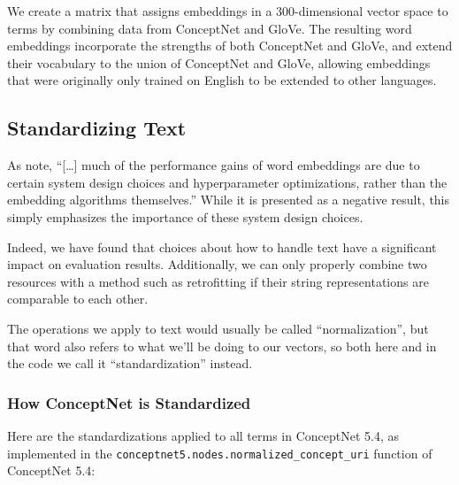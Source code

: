 \documentclass[letterpaper]{article}
\begin{document}
We create a matrix that assigns embeddings in a 300-dimensional vector
space to terms by combining data from ConceptNet and GloVe. The resulting word
embeddings incorporate the strengths of both ConceptNet and GloVe, and extend
their vocabulary to the union of ConceptNet and GloVe, allowing embeddings that
were originally only trained on English to be extended to other languages.

\subsection{Standardizing Text}

As  note,
``[\ldots] much of the performance gains of word embeddings are due to certain
system design choices and hyperparameter optimizations, rather than the
embedding algorithms themselves.'' While it is presented as a negative result,
this simply emphasizes the importance of these system design choices.

Indeed, we have found that choices about how to handle text have a significant
impact on evaluation results. Additionally, we can only properly combine two
resources with a method such as retrofitting if their string representations
are comparable to each other.

The operations we apply to text would usually be called ``normalization'',
but that word also refers to what we'll be doing to our vectors, so both
here and in the code we call it ``standardization'' instead.

\subsubsection{How ConceptNet is Standardized}

Here are the standardizations applied to all terms in ConceptNet 5.4, as
implemented in the {\tt conceptnet5.nodes.normalized\_concept\_uri} function
of ConceptNet 5.4:
\end{document}
